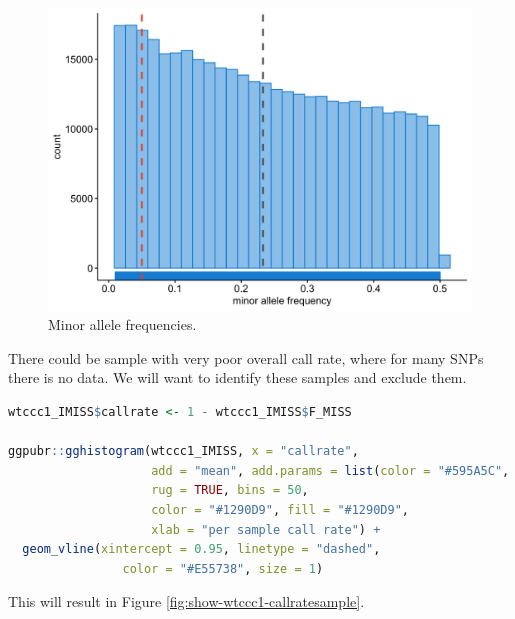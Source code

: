 \documentclass[
]{book}
\begin{document}
\begin{figure}

{\centering \includegraphics[width=18.67in]{img/_gwas/WTCCC1 FREQ} 

}

\caption{Minor allele frequencies.}\label{fig:show-wtccc1-freq}
\end{figure}

There could be sample with very poor overall call rate, where for many SNPs there is no data. We will want to identify these samples and exclude them.

\begin{lstlisting}[language=R]
wtccc1_IMISS$callrate <- 1 - wtccc1_IMISS$F_MISS

ggpubr::gghistogram(wtccc1_IMISS, x = "callrate",
                    add = "mean", add.params = list(color = "#595A5C", linetype = "dashed", size = 1),
                    rug = TRUE, bins = 50,
                    color = "#1290D9", fill = "#1290D9",
                    xlab = "per sample call rate") +
  geom_vline(xintercept = 0.95, linetype = "dashed",
                color = "#E55738", size = 1)
\end{lstlisting}

This will result in Figure \ref{fig:show-wtccc1-callratesample}.
\end{document}
